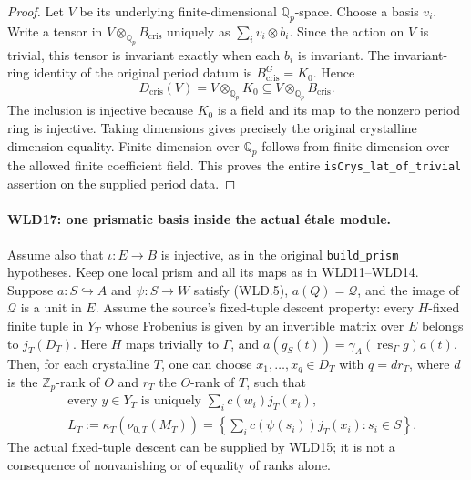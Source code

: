 \documentclass[11pt,a4paper]{article}
\numberwithin{equation}{section}
\theoremstyle{remark}\newtheorem{remark}[theorem]{Remark}
\begin{document}
\begin{proof}
Let $V$ be its underlying finite-dimensional $\mathbb Q_p$-space.
Choose a basis $v_i$. Write a tensor in
$V\otimes_{\mathbb Q_p}B_{\mathrm{cris}}$ uniquely as
$\sum_i v_i\otimes b_i$. Since the action on $V$ is trivial,
this tensor is invariant exactly when each $b_i$ is invariant.
The invariant-ring identity of the original period datum is
$B_{\mathrm{cris}}^G=K_0$. Hence
\[
            D_{\mathrm{cris}}(V)
              =V\otimes_{\mathbb Q_p}K_0
              \subseteq V\otimes_{\mathbb Q_p}B_{\mathrm{cris}}.
\]
The inclusion is injective because $K_0$ is a field and its map to
the nonzero period ring is injective. Taking dimensions gives
precisely the original crystalline dimension equality.
Finite dimension over $\mathbb Q_p$ follows from finite dimension
over the allowed finite coefficient field. This proves the entire
\texttt{is\allowbreak Crys\_\allowbreak lat\_\allowbreak of\_\allowbreak trivial} assertion on the supplied period data.
\end{proof}

\paragraph{WLD17: one prismatic basis inside the actual \'etale module.}
\label{claim:WLD17}
Assume also that $\iota:E\to B$ is injective, as in the original
\texttt{build\_\allowbreak prism} hypotheses.
Keep one local prism and all its maps as in WLD11--WLD14. Suppose
$a:S\hookrightarrow A$ and $\psi:S\to W$ satisfy (WLD.5),
$a(Q)=\mathcal Q$, and the image of $\mathcal Q$ is a unit in $E$.
Assume the source's fixed-tuple descent property: every $H$-fixed
finite tuple in $Y_T$ whose Frobenius is given by an invertible
matrix over $E$ belongs to $j_T(D_T)$. Here $H$ maps trivially
to $\Gamma$, and $a(g_S(t))=\gamma_A(\operatorname{res}_\Gamma g)a(t)$.
Then, for each crystalline $T$, one can choose $x_1,\ldots,x_q\in D_T$
with $q=dr_T$, where $d$ is the $\mathbb Z_p$-rank of $O$ and
$r_T$ the $O$-rank of $T$, such that
\[
 \begin{split}
 &\text{every }y\in Y_T
          \text{ is uniquely }\sum_i c(w_i)j_T(x_i),\\
 &L_T:=\kappa_T(\nu_{0,T}(M_T))
       =\left\{\sum_i c(\psi(s_i))j_T(x_i):s_i\in S\right\}.
 \end{split}                                                \tag{WLD.20}
\]
The actual fixed-tuple descent can be supplied by WLD15; it is not
a consequence of nonvanishing or of equality of ranks alone.
\end{document}
